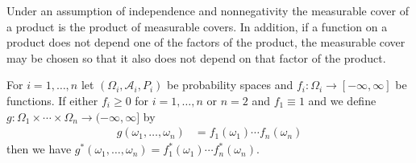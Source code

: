 Under an assumption of independence and nonnegativity the measurable cover of a product is the product of measurable covers.  In addition, if a function on a product does not depend one of the factors of the product, the measurable cover may be chosen so that it also does not depend on that factor of the product.
\begin{prop}\label{MeasurableCoverProductOfIndependent}For $i=1, \dotsc, n$ let $(\Omega_i, \mathcal{A}_i, P_i)$  be probability spaces and $f_i : \Omega_i \to [-\infty, \infty]$ be functions.  If either $f_i \geq 0$ for $i=1, \dotsc, n$ or $n=2$ and $f_1 \equiv 1$ and we define $g : \Omega_1 \times \dotsb \times \Omega_n \to (-\infty, \infty]$ by
\begin{align*}
g(\omega_1, \dotsc, \omega_n) &= f_1(\omega_1) \dotsb f_n(\omega_n)
\end{align*}
then we have $g^*(\omega_1, \dotsc, \omega_n) = f^*_1(\omega_1) \dotsb f^*_n(\omega_n)$.
\end{prop}
